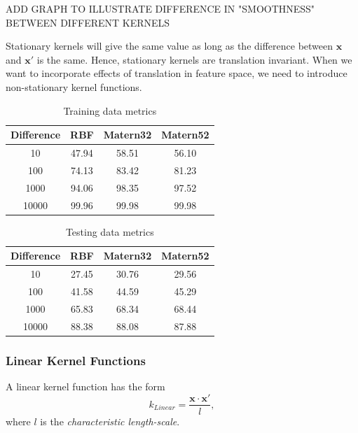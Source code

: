 \documentclass[11pt,a4paper]{article}
\theoremstyle{definition}
\numberwithin{equation}{section}
\let\vec\mathbf
\begin{document}
ADD GRAPH TO ILLUSTRATE DIFFERENCE IN "SMOOTHNESS" BETWEEN DIFFERENT KERNELS

Stationary kernels will give the same value as long as the difference between $\vec x$ and $\vec x'$ is the same. Hence, stationary kernels are translation invariant. When we want to incorporate effects of translation in feature space, we need to introduce non-stationary kernel functions.

\begin{table}[h!]
	\begin{center}
		\caption{Training data metrics}
		\label{tab:table1}
		\begin{tabular}{c|c|c|c}
			\mbox{Difference} & \mbox{RBF} & \mbox{Matern32}& \mbox{Matern52}\\ %
			\hline
			10&47.94&58.51&56.10\\
			100&74.13&	83.42&	81.23\\
			1000&94.06&	98.35&	97.52\\
			10000&99.96&	99.98&	99.98
		\end{tabular}
	\end{center}
\end{table}

\begin{table}[h!]
	\begin{center}
		\caption{Testing data metrics}
		\label{tab:table1}
		\begin{tabular}{c|c|c|c}
			\mbox{Difference} & \mbox{RBF} & \mbox{Matern32}& \mbox{Matern52}\\ %
			\hline
			10&27.45&	30.76&	29.56\\
			100&41.58&	44.59&	45.29\\
			1000&65.83&	68.34&	68.44\\
			10000&88.38&	88.08&	87.88
		\end{tabular}
	\end{center}
\end{table}

\subsubsection*{Linear Kernel Functions}
A linear kernel function has the form
\begin{equation}
k_{Linear} = \frac{\vec x \cdot \vec x'}{l},
\end{equation}
where $l$ is the \textit{characteristic length-scale}.
\end{document}
